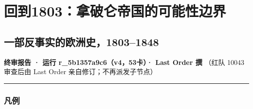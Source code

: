 \documentclass[
  10pt,
  a4paper,
]{article}
\author{}
\date{}
\begin{document}
\section{回到1803：拿破仑帝国的可能性边界}\label{ux56deux52301803ux62ffux7834ux4ed1ux5e1dux56fdux7684ux53efux80fdux6027ux8fb9ux754c}

\subsection{一部反事实的欧洲史，1803--1848}\label{ux4e00ux90e8ux53cdux4e8bux5b9eux7684ux6b27ux6d32ux53f218031848}

\textbf{终审报告 · 运行 r\_5b1357a9c6（v4，53卡）· Last Order 撰} （红队
10043 审查后由 Last Order 亲自修订；不再派发子节点）

\begin{center}\rule{0.5\linewidth}{0.5pt}\end{center}

\subsubsection{凡例}\label{ux51e1ux4f8b}
\end{document}

